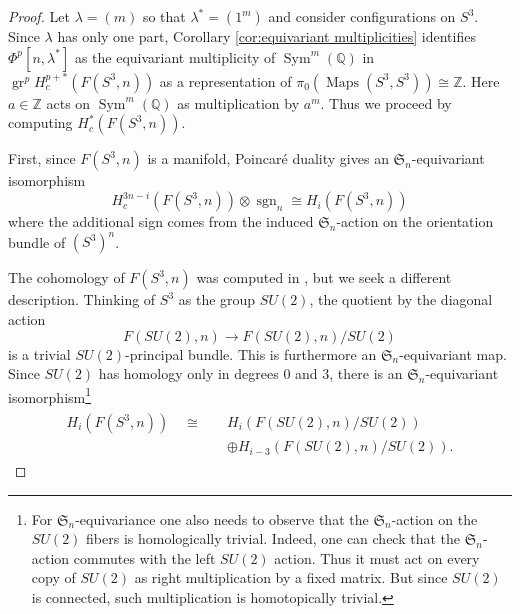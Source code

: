 \documentclass[12pt]{article}
\newcommand{\Q}{\mathbb{Q}}
\newcommand{\SymGroup}[1][n]{\mathfrak{S}_{#1}}
\newcommand{\TransposePartition}[1]{{#1}^{\ast}}
\newcommand{\EndSpace}[1]{\operatorname{Maps}({#1},{#1})}
\newcommand{\sgn}[1][n]{\operatorname{sgn}_{#1}}
\DeclareMathOperator{\gr}{gr}
\DeclareMathOperator{\Sym}{Sym}
\theoremstyle{plain}
\theoremstyle{definition}
\theoremstyle{remark}
\begin{document}
\begin{proof}
    Let $\lambda = (m)$ so that $\TransposePartition{\lambda}=(1^m)$ and consider configurations on $S^3$. Since $\lambda$ has only one part, Corollary \ref{cor:equivariant multiplicities} identifies $\Phi^p[n,\TransposePartition{\lambda}]$ as the equivariant multiplicity of $\Sym^m(\Q)$ in $\gr^p H^{p+*}_c(F(S^3,n))$ as a representation of $\pi_0(\EndSpace{S^3})\cong \mathbb{Z}$. Here $a\in \mathbb{Z}$ acts on $\Sym^m(\Q)$ as multiplication by $a^m$. Thus we proceed by computing $H^*_c(F(S^3,n))$.
    
    First, since $F(S^3,n)$ is a manifold, Poincar\'{e} duality gives an $\SymGroup$-equivariant isomorphism
    \begin{equation}
        H^{3n-i}_c(F(S^3,n))\otimes \sgn \cong H_{i}(F(S^3,n))
    \end{equation}
    where the additional sign comes from the induced $\SymGroup$-action on the orientation bundle of $(S^3)^n$. %
    
    The cohomology of $F(S^3,n)$ was computed in \cite{FZ00}, but we seek a different description. Thinking of $S^3$ as the group $SU(2)$, the quotient by the diagonal action
    \begin{equation}
        F(SU(2),n) \to F(SU(2),n)/SU(2)
    \end{equation}
    is a trivial $SU(2)$-principal bundle. This is furthermore an $\SymGroup$-equivariant map. Since $SU(2)$ has homology only in degrees $0$ and $3$, there is an $\SymGroup$-equivariant isomorphism\footnote{For $\SymGroup$-equivariance one also needs to observe that the $\SymGroup$-action on the $SU(2)$ fibers is homologically trivial. Indeed, one can check that the $\SymGroup$-action commutes with the left $SU(2)$ action. Thus it must act on every copy of $SU(2)$ as right multiplication by a fixed matrix. But since $SU(2)$ is connected, such multiplication is homotopically trivial.}
    \begin{align}\label{eq:splitting configs on S^3}
    \begin{split}
        H_i(F(S^3,n)) \quad \cong \quad & H_i(F(SU(2),n)/SU(2)) \\ & \oplus  H_{i-3}(F(SU(2),n)/SU(2)).
    \end{split}
    \end{align}


\end{proof}
\end{document}
